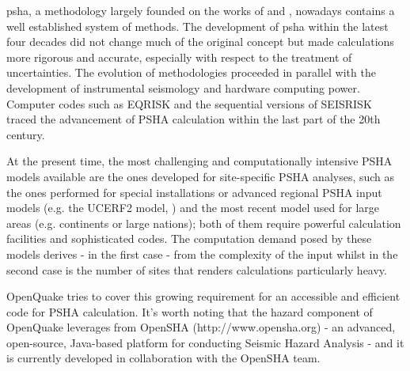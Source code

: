 \gls{psha}, a methodology largely founded on the works of 
\citet{cornell1968} and \citet{esteva1968}, nowadays contains a well
established system of methods. 
%
The development of \gls{psha} within the latest four decades did not 
change much of the original concept but made calculations more rigorous 
and accurate, especially with respect to the treatment of uncertainties. 
%
The evolution of methodologies proceeded in parallel with the development 
of instrumental seismology and hardware computing power. Computer codes 
such as EQRISK \citep{mcguire1976} and the sequential versions of SEISRISK
\citep{bender1982,bender1987} traced the advancement of PSHA calculation 
within the last part of the 20th century.

At the present time, the most challenging and computationally intensive 
PSHA models available are the ones developed for site-specific PSHA analyses, 
such as the ones performed for special installations or advanced regional 
PSHA input models (e.g. the UCERF2 model, \citet{field2009}) and the most  
recent model used for large areas (e.g. continents or large nations); both of them 
require powerful calculation facilities and sophisticated codes.
%
The computation demand posed by these models derives - in the first case - 
from the complexity of the input whilst in the second case is the number 
of sites that renders calculations particularly heavy.  

OpenQuake tries to cover this growing requirement for an accessible and 
efficient code for PSHA calculation. It's worth noting that the hazard 
component of OpenQuake leverages from OpenSHA (http://www.opensha.org) - 
an advanced, open-source, Java-based platform for conducting Seismic 
Hazard Analysis - and it is currently developed in collaboration with 
the OpenSHA team.  
%
